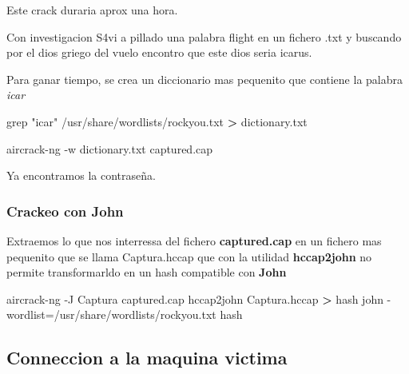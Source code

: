 \documentclass{assets/ipesethesis}
\newenvironment{Shaded}{\begin{snugshade}}{\end{snugshade}}
\newcommand{\ExtensionTok}[1]{#1}
\newcommand{\FunctionTok}[1]{\textcolor[rgb]{0.00,0.00,0.00}{#1}}
\newcommand{\NormalTok}[1]{#1}
\newcommand{\OperatorTok}[1]{\textcolor[rgb]{0.81,0.36,0.00}{\textbf{#1}}}
\newcommand{\StringTok}[1]{\textcolor[rgb]{0.31,0.60,0.02}{#1}}
\begin{document}
Este crack duraria aprox una hora.

Con investigacion S4vi a pillado una palabra flight en un fichero .txt y buscando por el dios griego del vuelo
encontro que este dios seria icarus.

Para ganar tiempo, se crea un diccionario mas pequenito que contiene la palabra \emph{icar}

\begin{Shaded}
\begin{Highlighting}[]
\FunctionTok{grep} \StringTok{"icar"}\NormalTok{ /usr/share/wordlists/rockyou.txt }\OperatorTok{>}\NormalTok{ dictionary.txt}
\end{Highlighting}
\end{Shaded}

\begin{Shaded}
\begin{Highlighting}[]
\ExtensionTok{aircrack-ng}\NormalTok{ -w dictionary.txt captured.cap}
\end{Highlighting}
\end{Shaded}

Ya encontramos la contraseña.

\hypertarget{crackeo-con-john}{%
\subsubsection*{Crackeo con John}\label{crackeo-con-john}}

Extraemos lo que nos interressa del fichero \textbf{captured.cap} en un fichero mas pequenito que se llama Captura.hccap que con la utilidad
\textbf{hccap2john} no permite transformarldo en un hash compatible con \textbf{John}

\begin{Shaded}
\begin{Highlighting}[]
\ExtensionTok{aircrack-ng}\NormalTok{ -J Captura captured.cap}
\ExtensionTok{hccap2john}\NormalTok{ Captura.hccap }\OperatorTok{>}\NormalTok{ hash}
\ExtensionTok{john}\NormalTok{ -wordlist=/usr/share/wordlists/rockyou.txt hash}
\end{Highlighting}
\end{Shaded}

\hypertarget{conneccion-a-la-maquina-victima}{%
\subsection*{Conneccion a la maquina victima}\label{conneccion-a-la-maquina-victima}}
\end{document}
